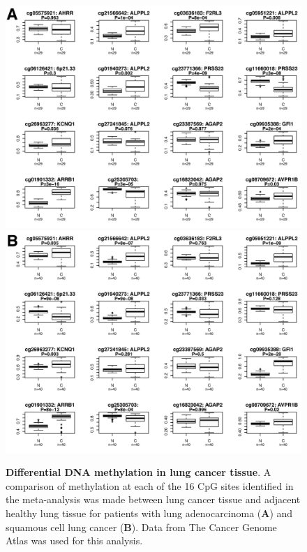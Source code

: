 \documentclass[11pt,oneside]{bristolthesis}
\newcommand{\blandscape}{\begin{landscape}}
\newcommand{\elandscape}{\end{landscape}}
\begin{document}
\blandscape
\begin{figure}[htbp]
\includegraphics[width=0.5\linewidth]{figure/07-dnam_lungcancer_mr/Figure_4a} \includegraphics[width=0.5\linewidth]{figure/07-dnam_lungcancer_mr/Figure_4b} \caption[Differential DNA methylation in lung cancer tissue]{\textbf{Differential DNA methylation in lung cancer tissue}. A comparison of methylation at each of the 16 CpG sites identified in the meta-analysis was made between lung cancer tissue and adjacent healthy lung tissue for patients with lung adenocarcinoma (\textbf{A}) and squamous cell lung cancer (\textbf{B}). Data from The Cancer Genome Atlas was used for this analysis.}\label{fig:fig4-07}
\end{figure}
\elandscape
\end{document}
